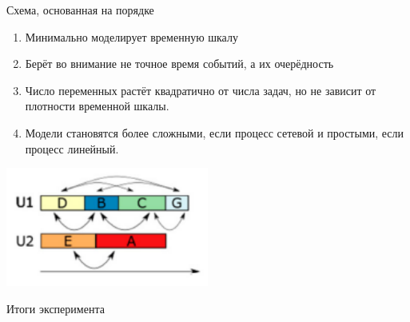 \documentclass{beamer}
\begin{document}
\begin{frame}{Схема, основанная на порядке}
	\begin{enumerate}
	\item Минимально моделирует временную шкалу
	\item Берёт во внимание не точное время событий, а их очерёдность
	\item Число переменных растёт квадратично от числа задач, но не зависит от плотности временной шкалы.
	\item Модели становятся более сложными, если процесс сетевой и простыми, если процесс линейный.
	
\end{enumerate}

\begin{center}
\includegraphics[width=0.5\textwidth]{precendance model}
\end{center}

\end{frame}

\begin{frame}{Итоги эксперимента}

	\begin{table}[50pt]
\centering
\renewcommand{\arraystretch}{2}
		\caption{Количество переменных и ограничений при разных подходах к построению модели.}
	\end{table}

\end{frame}
\end{document}
